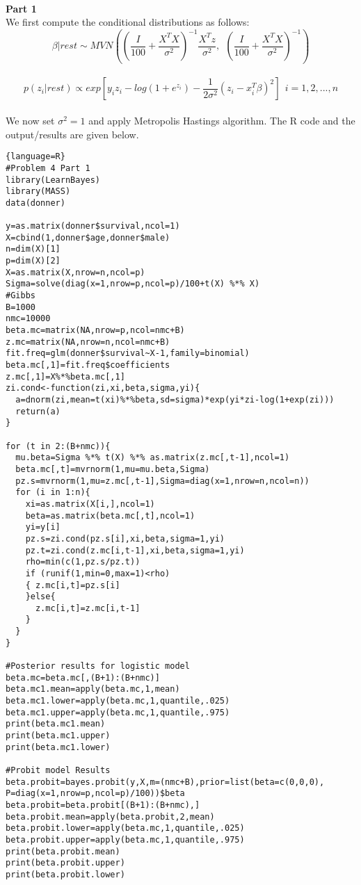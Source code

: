 \documentclass[12pt]{article}
\newenvironment{problem}[2][Problem]{\begin{trivlist}
\item[\hskip \labelsep {\bfseries #1}\hskip \labelsep {\bfseries #2.}]}{\end{trivlist}}
\begin{document}
\begin{problem}{4}
\text{} \\
\textbf{Part 1}\\
We first compute the conditional distributions as follows:\\
 $$\beta|rest \sim MVN\left(\left(\frac{I}{100}+\frac{X^T X}{\sigma^2}\right)^{-1}\frac{X^T z}{\sigma ^2},  \ \ \left(\frac{I}{100}+\frac{X^T X}{\sigma^2}\right)^{-1}\right) $$\\
 $$p(z_i|rest)\propto exp[y_i z_i-log(1+e^{z_i})-\frac{1}{2\sigma^2}(z_i-x_i^T \beta)^2] ~\ i=1,2,...,n$$\\
We now set $\sigma^2=1$ and apply Metropolis Hastings algorithm. The R code and the output/results are given below.\\
\begin{lstlisting}{language=R}
#Problem 4 Part 1
library(LearnBayes)
library(MASS)
data(donner)

y=as.matrix(donner$survival,ncol=1)
X=cbind(1,donner$age,donner$male)
n=dim(X)[1]
p=dim(X)[2]
X=as.matrix(X,nrow=n,ncol=p)
Sigma=solve(diag(x=1,nrow=p,ncol=p)/100+t(X) %*% X)
#Gibbs 
B=1000
nmc=10000
beta.mc=matrix(NA,nrow=p,ncol=nmc+B)
z.mc=matrix(NA,nrow=n,ncol=nmc+B)
fit.freq=glm(donner$survival~X-1,family=binomial)
beta.mc[,1]=fit.freq$coefficients
z.mc[,1]=X%*%beta.mc[,1]
zi.cond<-function(zi,xi,beta,sigma,yi){
  a=dnorm(zi,mean=t(xi)%*%beta,sd=sigma)*exp(yi*zi-log(1+exp(zi)))
  return(a)
}

for (t in 2:(B+nmc)){
  mu.beta=Sigma %*% t(X) %*% as.matrix(z.mc[,t-1],ncol=1)
  beta.mc[,t]=mvrnorm(1,mu=mu.beta,Sigma)
  pz.s=mvrnorm(1,mu=z.mc[,t-1],Sigma=diag(x=1,nrow=n,ncol=n))
  for (i in 1:n){
    xi=as.matrix(X[i,],ncol=1)
    beta=as.matrix(beta.mc[,t],ncol=1)
    yi=y[i]
    pz.s=zi.cond(pz.s[i],xi,beta,sigma=1,yi)
    pz.t=zi.cond(z.mc[i,t-1],xi,beta,sigma=1,yi)
    rho=min(c(1,pz.s/pz.t))
    if (runif(1,min=0,max=1)<rho)
    { z.mc[i,t]=pz.s[i]
    }else{
      z.mc[i,t]=z.mc[i,t-1]
    }
  }
}

#Posterior results for logistic model
beta.mc=beta.mc[,(B+1):(B+nmc)]
beta.mc1.mean=apply(beta.mc,1,mean)
beta.mc1.lower=apply(beta.mc,1,quantile,.025)
beta.mc1.upper=apply(beta.mc,1,quantile,.975)
print(beta.mc1.mean)
print(beta.mc1.upper)
print(beta.mc1.lower)

#Probit model Results
beta.probit=bayes.probit(y,X,m=(nmc+B),prior=list(beta=c(0,0,0), 
P=diag(x=1,nrow=p,ncol=p)/100))$beta
beta.probit=beta.probit[(B+1):(B+nmc),]
beta.probit.mean=apply(beta.probit,2,mean)
beta.probit.lower=apply(beta.mc,1,quantile,.025)
beta.probit.upper=apply(beta.mc,1,quantile,.975)
print(beta.probit.mean)
print(beta.probit.upper)
print(beta.probit.lower)
\end{lstlisting}


\end{problem}
\end{document}

